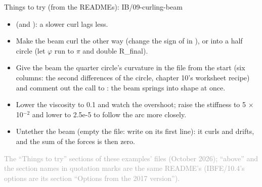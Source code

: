 \documentclass[aspectratio=169,11pt]{beamer}
\newcommand{\sourcecredit}[1]{\vfill\begin{flushright}\tiny\textcolor{DarkGray}{#1}\end{flushright}}
\begin{document}
\begin{frame}{Things to try (from the READMEs): IB/09-curling-beam}
\scriptsize\setlength{\leftmargini}{5em}
\begin{itemize}\setlength{\itemsep}{1pt}
  \item[IB/09.1]  (and ): a slower curl lags less.
  \item[IB/09.2] Make the beam curl the other way (change the sign of  in ), or into a half circle (let $\varphi$ run to $\pi$ and double R\_final).
  \item[IB/09.3] Give the beam the quarter circle's curvature in the  file from the start (six columns: the second differences of the circle, chapter 10's worksheet recipe) and comment out the call to : the beam springs into shape at once.
  \item[IB/09.4] Lower the viscosity to 0.1 and watch the overshoot; raise the stiffness to 5 $\times$ 10$^{-2}$ and lower  to 2.5e-5 to follow the arc more closely.
  \item[IB/09.5] Untether the beam (empty the  file: write  on its first line): it curls and drifts, and the sum of the forces is then zero.
\end{itemize}
\sourcecredit{The ``Things to try'' sections of these examples' \code{README.md} files (October 2026); ``above'' and the section names in quotation marks are the same README's (IBFE/10.4's options are its section ``Options from the 2017 version'').}
\end{frame}
\end{document}

